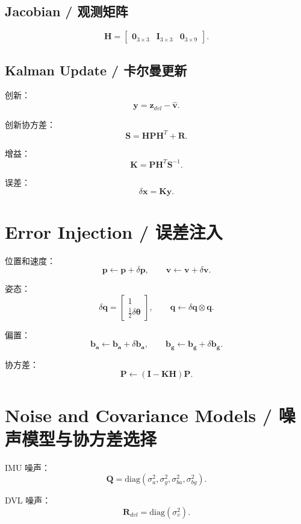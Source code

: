 \documentclass[12pt,a4paper]{ctexart} %
\begin{document}
\subsection{Jacobian / 观测矩阵}
\[
\mathbf{H} =
\begin{bmatrix}
\mathbf{0}_{3\times3} &
\mathbf{I}_{3\times3} &
\mathbf{0}_{3\times9}
\end{bmatrix}.
\]

\subsection{Kalman Update / 卡尔曼更新}

创新：
\[
\mathbf{y} = \mathbf{z}_{dvl} - \hat{\mathbf{v}}.
\]

创新协方差：
\[
\mathbf{S} = \mathbf{H} \mathbf{P} \mathbf{H}^T + \mathbf{R}.
\]

增益：
\[
\mathbf{K} = \mathbf{P} \mathbf{H}^T \mathbf{S}^{-1}.
\]

误差：
\[
\delta\mathbf{x} = \mathbf{K}\mathbf{y}.
\]

\section{Error Injection / 误差注入}

位置和速度：
\[
\mathbf{p} \leftarrow \mathbf{p} + \delta\mathbf{p},
\qquad
\mathbf{v} \leftarrow \mathbf{v} + \delta\mathbf{v}.
\]

姿态：
\[
\delta\mathbf{q} =
\begin{bmatrix}
1 \\ \frac{1}{2}\delta\boldsymbol{\theta}
\end{bmatrix},
\qquad
\mathbf{q} \leftarrow \delta\mathbf{q} \otimes \mathbf{q}.
\]

偏置：
\[
\mathbf{b_a} \leftarrow \mathbf{b_a} + \delta\mathbf{b_a},
\qquad
\mathbf{b_g} \leftarrow \mathbf{b_g} + \delta\mathbf{b_g}.
\]

协方差：
\[
\mathbf{P} \leftarrow (\mathbf{I} - \mathbf{K}\mathbf{H})\mathbf{P}.
\]

\section{Noise and Covariance Models / 噪声模型与协方差选择}

IMU 噪声：
\[
\mathbf{Q} = \mathrm{diag}(
\sigma_a^2, \sigma_g^2, \sigma_{ba}^2, \sigma_{bg}^2
).
\]

DVL 噪声：
\[
\mathbf{R}_{dvl} = \mathrm{diag}(\sigma_v^2).
\]
\end{document}
